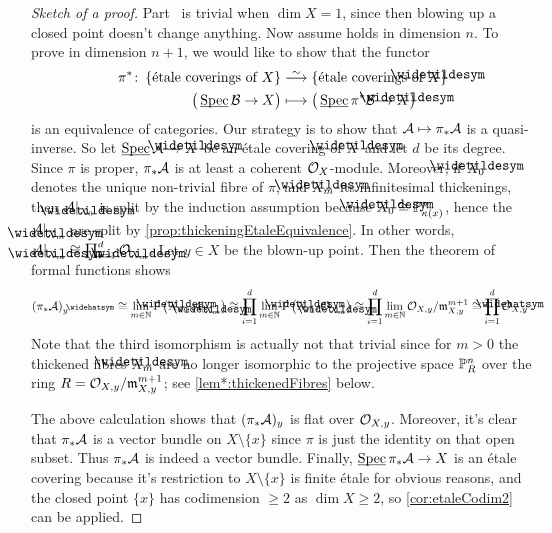 \begin{proof}[Sketch of a proof]
	Part~ is trivial when $\dim X=1$, since then blowing up a closed point doesn't change anything. Now assume  holds in dimension $n$. To prove  in dimension $n+1$, we would like to show that the functor
	\begin{align*}
	\pi^*\colon\left\{\text{étale coverings of $X$}\right\}&\isomorphism\left\{\text{étale coverings of $\snake{X}$}\right\}\\
	\big(\SPEC\Bb\rightarrow X\big)&\longmapsto \big(\SPEC \pi^*\Bb\rightarrow \snake{X}\big)
	\end{align*}
	is an equivalence of categories. Our strategy is to show that $\mathcal{A}\mapsto \pi_*\mathcal{A}$ is a quasi-inverse. So let $\SPEC\Aa\morphism\snake{X}$ be an étale covering of $\snake{X}$ and let $d$ be its degree. Since $\pi$ is proper, $\pi_*\mathcal{A}$ is at least a coherent $\mathcal{O}_X$-module. Moreover, if $\snake{X}_0$ denotes the unique non-trivial fibre of $\pi$, and $\snake{X}_m$ its infinitesimal thickenings, then $\Aa|_{\snake{X}_0}$ is split by the induction assumption because $\snake{X}_0\cong \IP_{\kappa(x)}^n$, hence the $\Aa|_{\snake{X}_m}$ are split by \cref{prop:thickeningEtaleEquivalence}. In other words, $\Aa|_{\snake{X}_m}\cong \smash{\prod_{i=1}^d\Oo_{\snake{X}_m}}$. Let $y\in X$ be the blown-up point. Then the theorem of formal functions shows
	\begin{equation*}
		(\pi_*\Aa)_y^\complete\cong \limit_{m\in\IN}\Global\big(\snake{X}_m,\Aa|_{\snake{X}_m}\big)\cong \prod_{i=1}^d\limit_{m\in\IN}\Global\big(\snake{X}_m,\Oo_{\snake{X}_m}\big)\cong \prod_{i=1}^d\limit_{m\in\IN}\Oo_{X,y}/\mm_{X,y}^{m+1}\cong \prod_{i=1}^d\roof{\Oo}_{X,y}\,.
	\end{equation*}
	Note that the third isomorphism is actually not that trivial since for $m>0$ the thickened fibres $\snake{X}_m$  are no longer isomorphic to the projective space $\mathbb{P}_R^n$ over the ring $R=\mathcal{O}_{X,y}/\mathfrak{m}_{X,y}^{m+1}$; see \cref{lem*:thickenedFibres} below.
	
	The above calculation shows that $(\pi_*\mathcal{A})_y$ is flat over $\mathcal{O}_{X,y}$. Moreover, it's clear that $\pi_*\mathcal{A}$ is a vector bundle on $X\setminus\{x\}$ since $\pi$ is just the identity on that open subset. Thus $\pi_*\mathcal{A}$ is indeed a vector bundle. Finally, $\SPEC \pi_*\Aa\morphism X$ is an étale covering because it's restriction to $X\setminus\{x\}$ is finite étale for obvious reasons, and the closed point $\{x\}$ has codimension $\geq 2$ as $\dim X\geq 2$, so \cref{cor:etaleCodim2} can be applied.
	

\end{proof}
